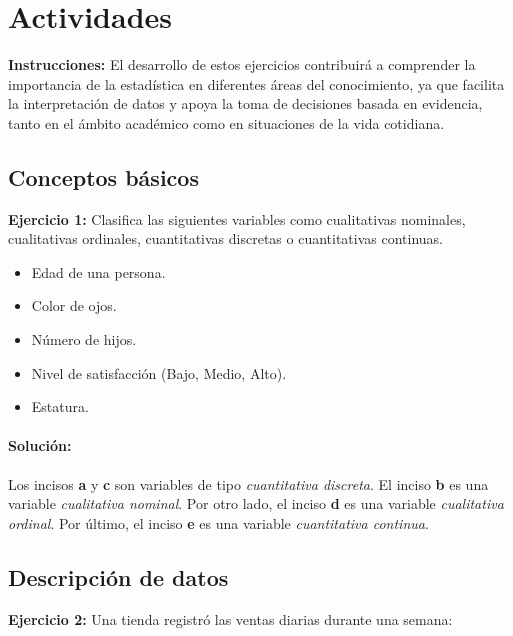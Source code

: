 \documentclass[12pt]{article}
\begin{document}
\newpage

\section*{\centering Actividades}

\textbf{Instrucciones:} El desarrollo de estos ejercicios contribuirá a comprender la importancia de la estadística en diferentes áreas del conocimiento, ya que facilita la interpretación de datos y apoya la toma de decisiones basada en evidencia, tanto en el ámbito académico como en situaciones de la vida cotidiana.


\subsection*{\centering Conceptos básicos}
\textbf{Ejercicio 1:} Clasifica las siguientes variables como cualitativas nominales, cualitativas ordinales, cuantitativas discretas o cuantitativas continuas.

\begin{itemize}
    \item [a.] Edad de una persona.
    \item [b.] Color de ojos.
    \item [c.] Número de hijos.
    \item [d.] Nivel de satisfacción (Bajo, Medio, Alto).
    \item [e.] Estatura.
\end{itemize}

\paragraph{\textbf{Solución: }}
Los incisos \textbf{a} y \textbf{c} son variables de tipo \textit{cuantitativa discreta}. El inciso \textbf{b} es una variable \textit{cualitativa nominal}. Por otro lado, el inciso \textbf{d} es una variable \textit{cualitativa ordinal}. Por último, el inciso \textbf{e} es una variable \textit{cuantitativa continua}.

\subsection*{\centering Descripción de datos}
\textbf{Ejercicio 2:} Una tienda registró las ventas diarias durante una semana: 
\end{document}
